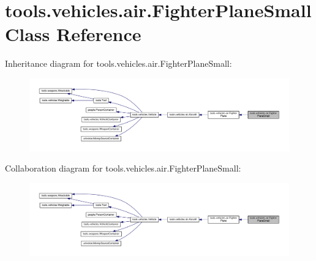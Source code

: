 \hypertarget{classtools_1_1vehicles_1_1air_1_1_fighter_plane_small}{}\section{tools.\+vehicles.\+air.\+Fighter\+Plane\+Small Class Reference}
\label{classtools_1_1vehicles_1_1air_1_1_fighter_plane_small}


Inheritance diagram for tools.\+vehicles.\+air.\+Fighter\+Plane\+Small\+:
\nopagebreak
\begin{figure}[H]
\begin{center}
\leavevmode
\includegraphics[width=350pt]{classtools_1_1vehicles_1_1air_1_1_fighter_plane_small__inherit__graph}
\end{center}
\end{figure}


Collaboration diagram for tools.\+vehicles.\+air.\+Fighter\+Plane\+Small\+:
\nopagebreak
\begin{figure}[H]
\begin{center}
\leavevmode
\includegraphics[width=350pt]{classtools_1_1vehicles_1_1air_1_1_fighter_plane_small__coll__graph}
\end{center}
\end{figure}
